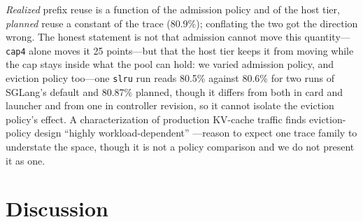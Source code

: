 \emph{Realized} prefix reuse is a function of the admission policy and of the
host tier, \emph{planned} reuse a constant of the trace (80.9\%); conflating the
two got the direction wrong. The honest statement is not that
admission cannot move this quantity---\texttt{cap4} alone moves it 25 points---but
that the host tier keeps it from moving while the cap stays inside what the
pool can hold: we varied admission policy, and eviction policy too---one \texttt{slru}
run reads 80.5\% against 80.6\% for two runs of SGLang's \cite{zheng2024sglang}
default and 80.87\% planned, though it differs from both in card and launcher and
from one in controller revision, so it cannot isolate the eviction policy's
effect. A characterization of
production KV-cache traffic finds eviction-policy design ``highly
workload-dependent'' \cite{wang2025kvcachewild}---reason to expect one trace
family to understate the space, though it is not a policy comparison and we do
not present it as one.

\section{Discussion}
\label{sec:discussion}
\label{sec:repro}

